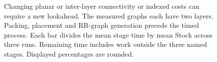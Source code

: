 \begin{figure}[t]
\caption{Changing planar or inter-layer connectivity or indexed costs can require a new lookahead. The measured graphs each have two layers. Packing, placement and RR-graph generation precede the timed process. Each bar divides the mean stage time by mean Stock \processtime{} across three runs. Remaining time includes work outside the three named stages. Displayed percentages are rounded.}
\label{fig:motivation}
\end{figure}
